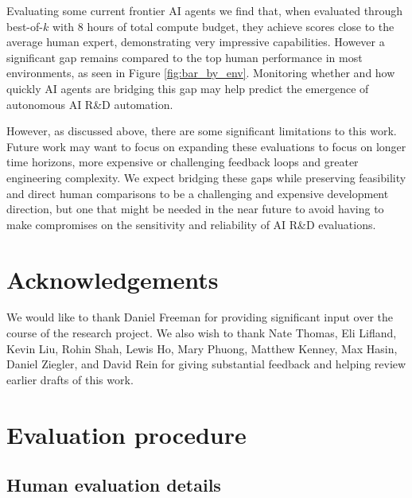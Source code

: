 \documentclass{article}
\begin{document}
Evaluating some current frontier AI agents we find that, when evaluated through best-of-$k$ with 8 hours of total compute budget, they achieve scores close to the average human expert, demonstrating very impressive capabilities. However a significant gap remains compared to the top human performance in most environments, as seen in Figure \ref{fig:bar_by_env}. Monitoring whether and how quickly AI agents are bridging this gap may help predict the emergence of autonomous AI R\&D automation. 

However, as discussed above, there are some significant limitations to this work. Future work may want to focus on expanding these evaluations to focus on longer time horizons, more expensive or challenging feedback loops and greater engineering complexity. We expect bridging these gaps while preserving feasibility and direct human comparisons to be a challenging and expensive development direction, but one that might be needed in the near future to avoid having to make compromises on the sensitivity and reliability of AI R\&D evaluations.

\section*{Acknowledgements}
We would like to thank Daniel Freeman for providing significant input over the course of the research project. We also wish to thank Nate Thomas, Eli Lifland, Kevin Liu, Rohin Shah, Lewis Ho, Mary Phuong, Matthew Kenney, Max Hasin, Daniel Ziegler, and David Rein for giving substantial feedback and helping review earlier drafts of this work.




\clearpage
\appendix

\section{Evaluation procedure}
\label{sec:eval_procedure}
\subsection{Human evaluation details}
\end{document}
